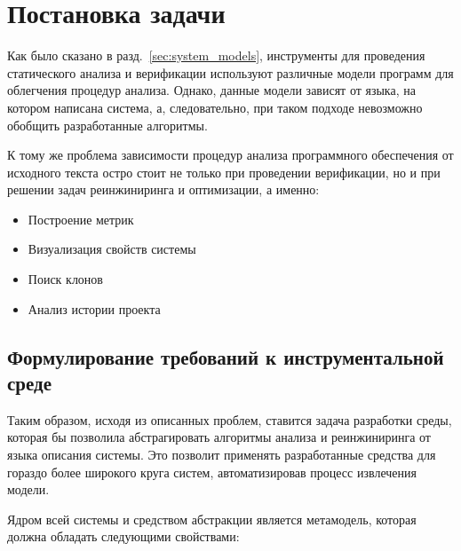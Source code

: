 \chapter{Постановка задачи}
\label{sec:task}
Как было сказано в разд.~\ref{sec:system_models}, инструменты для проведения
статического анализа и верификации используют различные модели программ для
облегчения процедур анализа. Однако, данные модели зависят от языка, на котором
написана система, а, следовательно, при таком подходе невозможно обобщить
разработанные алгоритмы.

К тому же проблема зависимости процедур анализа программного обеспечения от
исходного текста остро стоит не только при проведении верификации, но и при
решении задач реинжиниринга и оптимизации, а именно:

\begin{itemize}
    \item Построение метрик
    \item Визуализация свойств системы
    \item Поиск клонов
    \item Анализ истории проекта
\end{itemize}

\section{Формулирование требований к инструментальной среде}

Таким образом, исходя из описанных проблем, ставится задача разработки среды,
которая бы позволила абстрагировать алгоритмы анализа и реинжиниринга от языка
описания системы. Это позволит применять разработанные средства для гораздо
более широкого круга систем, автоматизировав процесс извлечения модели.

Ядром всей системы и средством абстракции является метамодель, которая должна
обладать следующими свойствами:


